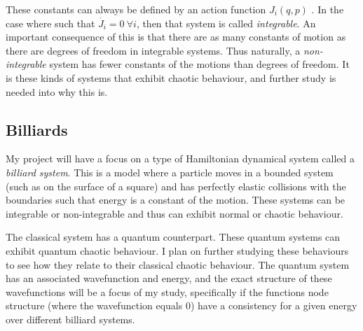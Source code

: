 \documentclass[12pt,a4paper]{amsart}
\begin{document}

These constants can always be defined by an action function $J_{i}(q, p)$ \cite{HILBORN}. In the case where such that $\dot{J_{i}} = 0 \ \forall i$, then that system is called \textit{integrable}. An important consequence of this is that there are as many constants of motion as there are degrees of freedom in integrable systems. Thus naturally, a \textit{non-integrable} system has fewer constants of the motions than degrees of freedom. It is these kinds of systems that exhibit chaotic behaviour, and further study is needed into why this is.

 

\subsection{Billiards}

My project will have a focus on a type of Hamiltonian dynamical system called a \textit{billiard system}. This is a model where a particle moves in a bounded system (such as on the surface of a square) and has perfectly elastic collisions with the boundaries such that energy is a constant of the motion. These systems can be integrable or non-integrable and thus can exhibit normal or chaotic behaviour. 

The classical system has a quantum counterpart. These quantum systems can exhibit quantum chaotic behaviour. I plan on further studying these behaviours to see how they relate to their classical chaotic behaviour. The quantum system has an associated wavefunction and energy, and the exact structure of these wavefunctions will be a focus of my study, specifically if the functions node structure (where the wavefunction equals 0) have a consistency for a given energy over different billiard systems.

\end{document}
